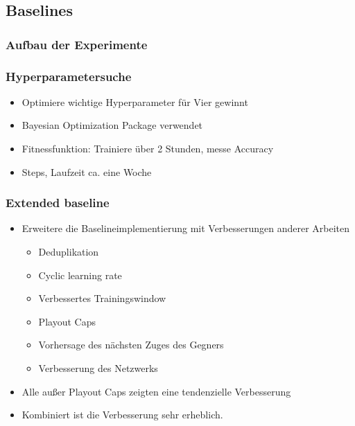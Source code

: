 \subsection{Baselines}



\begin{frame}
 \frametitle{Aufbau der Experimente}
  



  
\end{frame}
\begin{frame}
 \frametitle{Hyperparametersuche}
  


\begin{itemize}
  \item \pause Optimiere wichtige Hyperparameter für Vier gewinnt
  \item \pause Bayesian Optimization Package verwendet
  \item \pause Fitnessfunktion: Trainiere über 2 Stunden, messe Accuracy
  \item {} Steps, Laufzeit ca. eine Woche
\end{itemize}



  
\end{frame}
\begin{frame}
 \frametitle{Extended baseline}
  


\begin{itemize}
  \item \pause Erweitere die Baselineimplementierung mit Verbesserungen anderer Arbeiten
\begin{itemize}
  \item \pause Deduplikation
  \item \pause Cyclic learning rate
  \item \pause Verbessertes Trainingswindow
  \item \pause Playout Caps
  \item \pause Vorhersage des nächsten Zuges des Gegners
  \item \pause Verbesserung des Netzwerks
\end{itemize}
\end{itemize}

\begin{itemize}
  \item \pause Alle außer Playout Caps zeigten eine tendenzielle Verbesserung
  \item \pause Kombiniert ist die Verbesserung sehr erheblich.
\end{itemize}

  
\end{frame}
